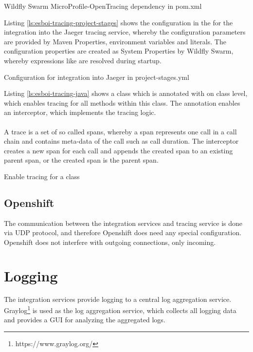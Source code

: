 \begin{listing}[h]
	\caption{Wildfly Swarm MicroProfile-OpenTracing dependency in pom.xml}
	\label{ls:esboi-tracing-pom}
\end{listing}

Listing \vref{ls:esboi-tracing-project-stages} shows the configuration  in the  for the integration into the Jaeger tracing service, whereby the configuration parameters are provided by Maven Properties, environment variables and literals. The configuration properties are created as System Properties by Wildfly Swarm, whereby  expressions like  are resolved during startup.

\begin{listing}[h]
	\caption{Configuration for integration into Jaeger in project-stages.yml}
	\label{ls:esboi-tracing-project-stages}
\end{listing}

Listing \vref{ls:esboi-tracing-java} shows a class which is annotated with  on class level, which enables tracing for all methods within this class. The annotation  enables an interceptor, which implements the tracing logic. 
\\ \\
A trace is a set of so called spans, whereby a span represents one call in a call chain and contains meta-data of the call such as call duration. The interceptor creates a new span for each call and appends the created span to an existing parent span, or the created span is the parent span. 

\begin{listing}[h]
	\caption{Enable tracing for a class}
	\label{ls:esboi-tracing-java}
\end{listing}

\subsection{Openshift}
\label{sec:esbi-tracing-openshift}
The communication between the integration services and tracing service is done via UDP protocol, and therefore Openshift does need any special configuration. Openshift does not interfere with outgoing connections, only incoming.

\section{Logging}
\label{sec:esbi-logging}
The integration services provide logging to a central log aggregation service. Graylog\footnote{https://www.graylog.org/} is used as the log aggregation service, which collects all logging data and provides a GUI for analyzing the aggregated logs.

